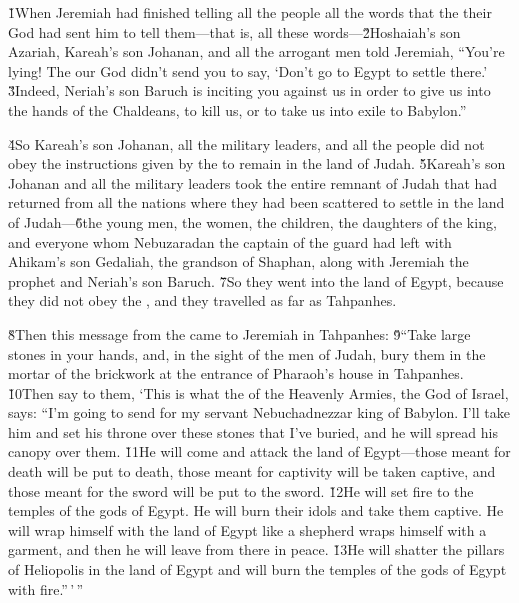 \v{1}When Jeremiah had finished telling all the people all the words that the  their God had sent him to tell them---that is, all these words---\v{2}Hoshaiah's son Azariah, Kareah's son Johanan, and all the arrogant men told Jeremiah, ``You're lying! The  our God didn't send you to say, `Don't go to Egypt to settle there.' \v{3}Indeed, Neriah's son Baruch is inciting you against us in order to give us into the hands of the Chaldeans, to kill us, or to take us into exile to Babylon.''

\v{4}So Kareah's son Johanan, all the military leaders, and all the people did not obey the instructions given by the  to remain in the land of Judah. \v{5}Kareah's son Johanan and all the military leaders took the entire remnant of Judah that had returned from all the nations where they had been scattered to settle in the land of Judah---\v{6}the young men, the women, the children, the daughters of the king, and everyone whom Nebuzaradan the captain of the guard had left with Ahikam's son Gedaliah, the grandson of Shaphan, along with Jeremiah the prophet and Neriah's son Baruch. \v{7}So they went into the land of Egypt, because they did not obey the , and they travelled as far as Tahpanhes.

\v{8}Then this message from the  came to Jeremiah in Tahpanhes: \v{9}``Take large stones in your hands, and, in the sight of the men of Judah, bury them in the mortar of the brickwork at the entrance of Pharaoh's house in Tahpanhes. \v{10}Then say to them, `This is what the  of the Heavenly Armies, the God of Israel, says: ``I'm going to send for my servant Nebuchadnezzar king of Babylon. I'll take him and set his throne over these stones that I've buried, and he will spread his canopy over them. \v{11}He will come and attack the land of Egypt---those meant for death will be put to death, those meant for captivity will be taken captive, and those meant for the sword will be put to the sword. \v{12}He will set fire to the temples of the gods of Egypt. He will burn their idols and take them captive. He will wrap himself with the land of Egypt like a shepherd wraps himself with a garment, and then he will leave from there in peace. \v{13}He will shatter the pillars of Heliopolis in the land of Egypt and will burn the temples of the gods of Egypt with fire.''\,'\,''

